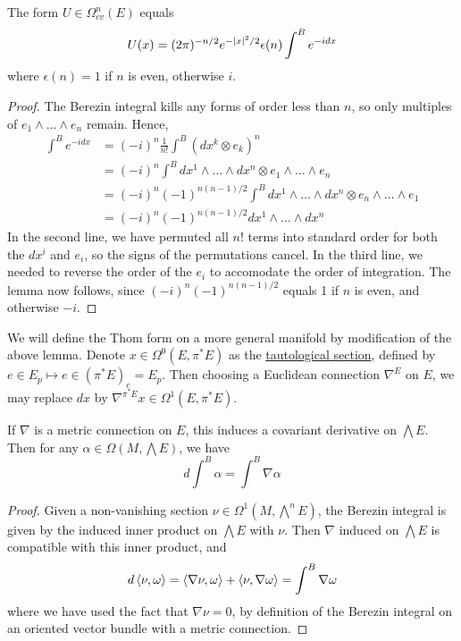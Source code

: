 \begin{lem} %
	The form $U\in \Omega^n_{cv}(E)$ equals 
	\[
		 U(x) = (2\pi)^{-n/2} e^{-\abs{x}^2 /2} \epsilon(n)\int^B e^{-idx}
	\] 
	where $\epsilon(n)=1$ if  $n$ is even, otherwise  $i$.
\end{lem}
\begin{proof}
	The Berezin integral kills any forms of order less than $n$, so only
	multiples of $e_1 \wedge \ldots\wedge e_n$ remain.
	Hence,
	\begin{align*}
		\int^B e^{-idx} 
		&= (-i)^n \frac{1}{n!}\int^B (dx^k\otimes e_k)^n \\
		&= (-i)^n \int^B dx^1\wedge \ldots\wedge dx^n\otimes e_1 \wedge\ldots\wedge e_n \\
		&= (-i)^n(-1)^{n(n-1)/2} \int^B dx^1\wedge \ldots\wedge dx^n\otimes e_n \wedge\ldots\wedge e_1 \\
		&= (-i)^n(-1)^{n(n-1)/2} dx^1\wedge \ldots\wedge dx^n
	\end{align*}
	In the second line, we have permuted all $n!$ terms into standard order for
	both the $dx^i$ and  $e_i$, so the signs of the permutations cancel.
	In the third line, we needed to reverse the order of the $e_i$ to accomodate
	the order of integration. The lemma now follows, since
	$(-i)^n(-1)^{n(n-1)/2}$ equals 1 if $n$ is even, and otherwise  $-i$. 
\end{proof}
We will define the Thom form on a more general manifold by modification of the
above lemma. Denote $x \in \Omega^0(E,\pi^*E)$ as the \underline{tautological
section}, defined by $e\in E_p \mapsto e\in (\pi^*E)_{e} = E_{p}$.
Then choosing a Euclidean connection $\nabla^E$ on  $E$, we may replace  $dx$ by 
$\nabla^{\pi^*E} x \in \Omega^1(E,\pi^*E)$.

\begin{prop} \label{prop:derivative_berezin} %
	If $\nabla$ is a metric connection on  $E$, this induces a covariant
	derivative on $\bigwedge E$. Then for any
	$\alpha\in\Omega(M,\bigwedge E)$, we have 
	\[
	d\int^B \alpha = \int^B \nabla\alpha
	\] 
\end{prop}
\begin{proof} 
	Given a non-vanishing section $\nu\in \Omega^1(M,\bigwedge^nE)$,
	the Berezin integral is given by the induced inner product on $\bigwedge E$
	with  $\nu$. Then  $\nabla$ induced on  $\bigwedge E$ is compatible with
	this inner product, and 
	\[
	d\gen{\nu,\omega} = \gen{\nabla \nu, \omega} + \gen{\nu, \nabla \omega}
	=\int^B \nabla\omega
	\] 
	where we have used the fact that $\nabla \nu = 0$, by definition of the
	Berezin integral on an oriented vector bundle with a metric connection.
\end{proof}

